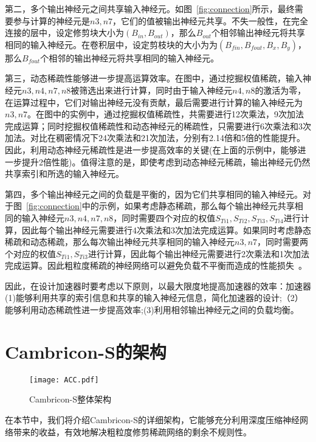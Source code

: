 第二，多个输出神经元之间共享输入神经元。如图~\ref{fig:connection}所示，最终需要参与计算的神经元是$n3, n7$，它们的值被输出神经元共享。不失一般性，在完全连接的层中，设定修剪块大小为$(B_{in},B_{out})$，那么$B_{out}$个相邻输出神经元将共享相同的输入神经元。在卷积层中，设定剪枝块的大小为为$(B_{fin},B_{fout},B_x,B_y)$，那么$B_{fout}$个相邻的输出神经元将共享相同的输入神经元。

第三，动态稀疏性能够进一步提高运算效率。在图中，通过挖掘权值稀疏，输入神经元$n3, n4, n7, n8$被筛选出来进行计算，同时由于输入神经元$n4, n8$的激活为零，在运算过程中，它们对输出神经元没有贡献，最后需要进行计算的输入神经元为$n3, n7$。在图中的实例中，通过挖掘权值稀疏性，共需要进行12次乘法，9次加法完成运算；同时挖掘权值稀疏性和动态神经元的稀疏性，只需要进行6次乘法和3次加法。对比在稠密情况下24次乘法和21次加法，分别有2.14倍和5倍的性能提升。因此，利用动态神经元稀疏性是进一步提高效率的关键(在上面的示例中，能够进一步提升2倍性能)。值得注意的是，即使考虑到动态神经元稀疏，输出神经元仍然共享索引和所选的输入神经元。

第四，多个输出神经元之间的负载是平衡的，因为它们共享相同的输入神经元。对于图~\ref{fig:connection}中的示例，如果考虑静态稀疏，那么每个输出神经元共享相同的输入神经元$n3, n4, n7, n8$，同时需要四个对应的权值$S_{Ti1}, S_{Ti2}, S_{Ti3}, S_{Ti4}$进行计算，因此每个输出神经元需要进行4次乘法和3次加法完成运算。如果同时考虑静态稀疏和动态稀疏，那么每次输出神经元共享相同的输入神经元$n3, n7$，同时需要两个对应的权值$S_{Ti1}, S_{Ti3}$进行计算，因此每个输出神经元需要进行2次乘法和1次加法完成运算。因此粗粒度稀疏的神经网络可以避免负载不平衡而造成的性能损失~\cite{han2017ese}。

因此，在设计加速器时要考虑以下原则，以最大限度地提高加速器的效率：加速器(1)能够利用共享的索引信息和共享的输入神经元信息，简化加速器的设计;（2）能够利用动态稀疏性进一步提高效率;(3)利用相邻输出神经元之间的负载均衡。


\section{Cambricon-S的架构}
\begin{figure}[h]
\centering
\texttt{[image: ACC.pdf]}
\caption{Cambricon-S整体架构}
\label{fig:acc}
\end{figure}

在本节中，我们将介绍Cambricon-S的详细架构，它能够充分利用深度压缩神经网络带来的收益，有效地解决粗粒度修剪稀疏网络的剩余不规则性。

